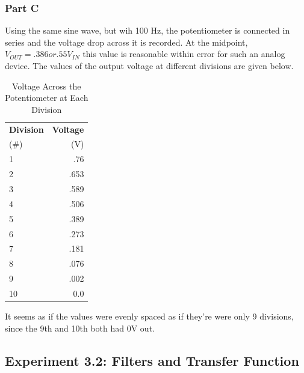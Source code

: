 \documentclass[10pt]{article}
\begin{document}
\subsubsection{Part C} 
	Using the same sine wave, but wih 100 Hz, the potentiometer is connected in series and the voltage drop across it is recorded. At the midpoint, $V_{OUT} = .386 or .55 V_{IN}$ this value is reasonable within error for such an analog device. 
	The values of the output voltage at different divisions are given below.
\begin{table}[H]
	\begin{center}
		\caption{Voltage Across the Potentiometer at Each Division}
		\label{tab: 31C}
		\begin{tabular}{l|r}
			\textbf{Division} & \textbf{Voltage}\\
			(\#) & (V)\\
			\hline
			1 & .76\\
			2 & .653\\
			3 & .589\\
			4 & .506\\
			5 & .389\\
			6 & .273\\
			7 & .181\\
			8 & .076\\
			9 & .002\\
			10 & 0.0\\
		\end{tabular}
	\end{center}
\end{table}
 	It seems as if the values were evenly spaced as if they're were only 9 divisions, since the 9th and 10th both had 0V out.
\subsection{Experiment 3.2: Filters and Transfer Function}
\end{document}
